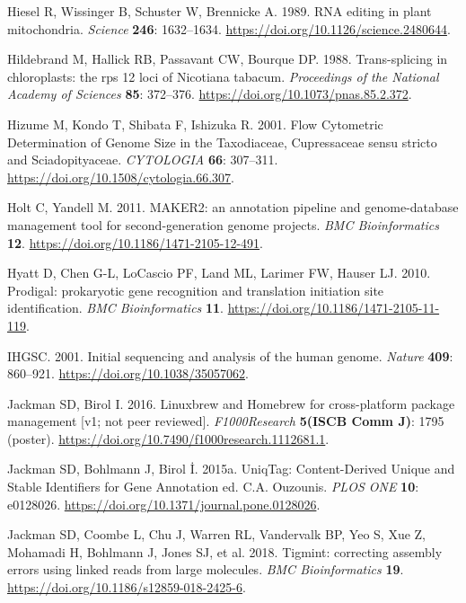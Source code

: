 \documentclass[
  12pt,
  oneside,
  openany]{book}
\begin{document}
\leavevmode\hypertarget{ref-Hiesel_1989}{}%
Hiesel R, Wissinger B, Schuster W, Brennicke A. 1989. RNA editing in plant mitochondria. \emph{Science} \textbf{246}: 1632--1634. \url{https://doi.org/10.1126/science.2480644}.

\leavevmode\hypertarget{ref-Hildebrand_1988}{}%
Hildebrand M, Hallick RB, Passavant CW, Bourque DP. 1988. Trans-splicing in chloroplasts: the rps 12 loci of Nicotiana tabacum. \emph{Proceedings of the National Academy of Sciences} \textbf{85}: 372--376. \url{https://doi.org/10.1073/pnas.85.2.372}.

\leavevmode\hypertarget{ref-Hizume_2001}{}%
Hizume M, Kondo T, Shibata F, Ishizuka R. 2001. Flow Cytometric Determination of Genome Size in the Taxodiaceae, Cupressaceae sensu stricto and Sciadopityaceae. \emph{CYTOLOGIA} \textbf{66}: 307--311. \url{https://doi.org/10.1508/cytologia.66.307}.

\leavevmode\hypertarget{ref-Holt_2011}{}%
Holt C, Yandell M. 2011. MAKER2: an annotation pipeline and genome-database management tool for second-generation genome projects. \emph{BMC Bioinformatics} \textbf{12}. \url{https://doi.org/10.1186/1471-2105-12-491}.

\leavevmode\hypertarget{ref-Hyatt_2010}{}%
Hyatt D, Chen G-L, LoCascio PF, Land ML, Larimer FW, Hauser LJ. 2010. Prodigal: prokaryotic gene recognition and translation initiation site identification. \emph{BMC Bioinformatics} \textbf{11}. \url{https://doi.org/10.1186/1471-2105-11-119}.

\leavevmode\hypertarget{ref-IHGSC_2001}{}%
IHGSC. 2001. Initial sequencing and analysis of the human genome. \emph{Nature} \textbf{409}: 860--921. \url{https://doi.org/10.1038/35057062}.

\leavevmode\hypertarget{ref-Jackman_2016}{}%
Jackman SD, Birol I. 2016. Linuxbrew and Homebrew for cross-platform package management {[}v1; not peer reviewed{]}. \emph{F1000Research} \textbf{5(ISCB Comm J)}: 1795 (poster). \url{https://doi.org/10.7490/f1000research.1112681.1}.

\leavevmode\hypertarget{ref-Jackman_2015_UniqTag}{}%
Jackman SD, Bohlmann J, Birol İ. 2015a. UniqTag: Content-Derived Unique and Stable Identifiers for Gene Annotation ed. C.A. Ouzounis. \emph{PLOS ONE} \textbf{10}: e0128026. \url{https://doi.org/10.1371/journal.pone.0128026}.

\leavevmode\hypertarget{ref-Jackman_2018}{}%
Jackman SD, Coombe L, Chu J, Warren RL, Vandervalk BP, Yeo S, Xue Z, Mohamadi H, Bohlmann J, Jones SJ, et al. 2018. Tigmint: correcting assembly errors using linked reads from large molecules. \emph{BMC Bioinformatics} \textbf{19}. \url{https://doi.org/10.1186/s12859-018-2425-6}.
\end{document}
